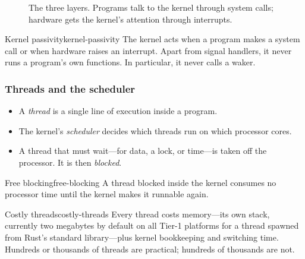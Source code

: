 \begin{figure}[htbp]
{}
    \caption{The three layers. Programs talk to the kernel through system calls; hardware gets the kernel's attention through interrupts.}
    \label{fig:wakers-2.1}
\end{figure}

\begin{axiom}{Kernel passivity}{kernel-passivity}
    The kernel acts when a program makes a system call or when hardware raises an interrupt. Apart from signal handlers, it never runs a program's own functions. In particular, it never calls a waker.
\end{axiom}

\subsubsection{Threads and the scheduler}

\begin{itemize}
    \item A \emph{thread} is a single line of execution inside a program.
    \item The kernel's \emph{scheduler} decides which threads run on which processor cores.
    \item A thread that must wait---for data, a lock, or time---is taken off the processor. It is then \emph{blocked}.
\end{itemize}

\begin{axiom}{Free blocking}{free-blocking}
    A thread blocked inside the kernel consumes no processor time until the kernel makes it runnable again.
\end{axiom}

\begin{axiom}{Costly threads}{costly-threads}
    Every thread costs memory---its own stack, currently two megabytes by default on all Tier-1 platforms for a thread spawned from Rust's standard library---plus kernel bookkeeping and switching time. Hundreds or thousands of threads are practical; hundreds of thousands are not.
\end{axiom}

